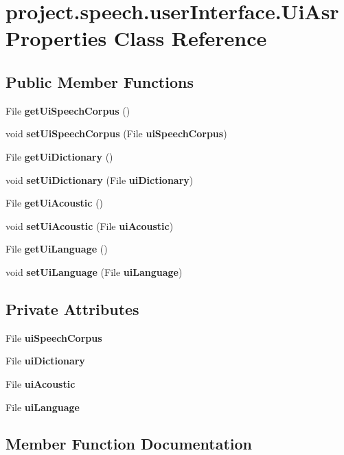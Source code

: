 \section{project.\+speech.\+user\+Interface.\+Ui\+Asr\+Properties Class Reference}
\label{classproject_1_1speech_1_1user_interface_1_1_ui_asr_properties}
\subsection*{Public Member Functions}
\begin{DoxyCompactItemize}
\item 
File {\bf get\+Ui\+Speech\+Corpus} ()
\item 
void {\bf set\+Ui\+Speech\+Corpus} (File {\bf ui\+Speech\+Corpus})
\item 
File {\bf get\+Ui\+Dictionary} ()
\item 
void {\bf set\+Ui\+Dictionary} (File {\bf ui\+Dictionary})
\item 
File {\bf get\+Ui\+Acoustic} ()
\item 
void {\bf set\+Ui\+Acoustic} (File {\bf ui\+Acoustic})
\item 
File {\bf get\+Ui\+Language} ()
\item 
void {\bf set\+Ui\+Language} (File {\bf ui\+Language})
\end{DoxyCompactItemize}
\subsection*{Private Attributes}
\begin{DoxyCompactItemize}
\item 
File {\bf ui\+Speech\+Corpus}
\item 
File {\bf ui\+Dictionary}
\item 
File {\bf ui\+Acoustic}
\item 
File {\bf ui\+Language}
\end{DoxyCompactItemize}


\subsection{Member Function Documentation}

